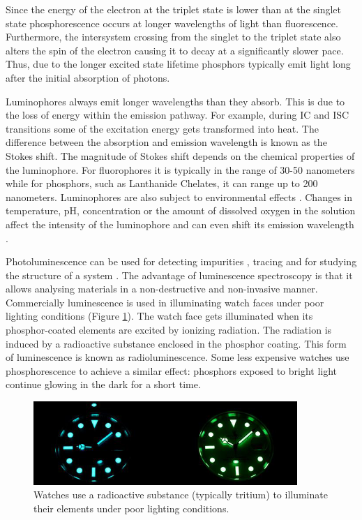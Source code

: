 \documentclass[thesis.tex]{subfiles}
\begin{document}
\noindent Since the energy of the electron at the triplet state is lower than at the singlet state phosphorescence occurs at longer wavelengths of light than fluorescence. Furthermore, the intersystem crossing from the singlet to the triplet state also alters the spin of the electron causing it to decay at a significantly slower pace. Thus, due to the longer excited state lifetime phosphors typically emit light long after the initial absorption of photons. \cite{CEJ}

Luminophores always emit longer wavelengths than they absorb. This is due to the loss of energy within the emission pathway. For example, during IC and ISC transitions some of the excitation energy gets transformed into heat. The difference between the absorption and emission wavelength is known as the Stokes shift. The magnitude of Stokes shift depends on the chemical properties of the luminophore. For fluorophores it is typically in the range of 30-50 nanometers while for phosphors, such as Lanthanide Chelates, it can range up to 200 nanometers. Luminophores are also subject to environmental effects \cite{hemmila}. Changes in temperature, pH, concentration or the amount of dissolved oxygen in the solution affect the intensity of the luminophore and can even shift its emission wavelength \cite{luminescence_basics}.

Photoluminescence can be used for detecting impurities \cite{photoluminescence_use_case_1}, tracing \cite{photoluminescence_use_case_2} and for studying the structure of a system \cite{photoluminescence_use_case_3}. The advantage of luminescence spectroscopy is that it allows analysing materials in a non-destructive and non-invasive manner. Commercially luminescence is used in illuminating watch faces under poor lighting conditions (Figure \ref{figure:photoluminescence_example}). The watch face gets illuminated when its phosphor-coated elements are excited by ionizing radiation. The radiation is induced by a radioactive substance enclosed in the phosphor coating. This form of luminescence is known as radioluminescence. Some less expensive watches use phosphorescence to achieve a similar effect: phosphors exposed to bright light continue glowing in the dark for a short time.

\begin{figure}[hb]
\centering \includegraphics[width=10cm]{images/photoluminescence_example}
\caption{Watches use a radioactive substance (typically tritium) to illuminate their elements under poor lighting conditions.\label{figure:photoluminescence_example}}
\end{figure}
\end{document}
